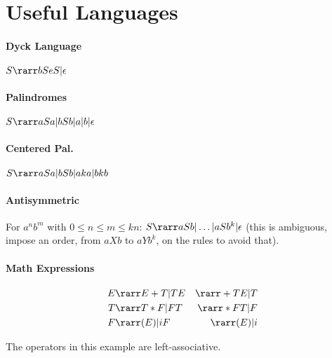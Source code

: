 \section{Useful Languages}

\paragraph{Dyck Language} $S \rarr bSeS | \epsilon$
\paragraph{Palindromes} $S \rarr aSa | bSb | a | b | \epsilon$
\paragraph{Centered Pal.} $S \rarr aSa | bSb | aka | bkb $
\paragraph{Antisymmetric} For $a^nb^m$ with $0 \le n \le m \le kn$: $S \rarr aSb | \ldots | aSb^k | \epsilon$ (this is ambiguous, impose an order, from $aXb$ to $aYb^k$, on the rules to avoid that).
\paragraph{Math Expressions}
\begin{align*}
    E &\rarr E + T | T     E &\rarr + T E | T\\
    T &\rarr T * F | F    T &\rarr * F T | F \\
    F &\rarr  (E)  | i    F &\rarr  (E)  | i
\end{align*}

The operators in this example are left-associative.
